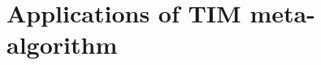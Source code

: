 \documentclass[a4paper,UKenglish,cleveref, autoref, thm-restate]{lipics-v2021} %
\begin{document}
\begin{toappendix}





\end{toappendix}
\section{Applications of TIM meta-algorithm}\label{sec:applications-tim}
\end{document}
